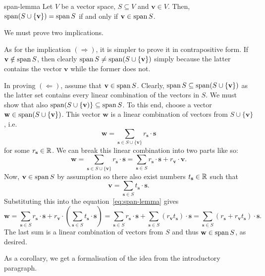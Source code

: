 \begin{lemma}{}{span-lemma}
 Let $V$ be a vector space, $S \subseteq V$ and $\mathbf{v} \in V$. Then, $\operatorname{span}
 (S \cup \{\mathbf{v}\}) = \operatorname{span} S$ if and only if $\mathbf{v} \in \operatorname{span} S$.
\end{lemma}
\begin{lemproof}
 We must prove two implications.

 As for the implication $( \Rightarrow )$, it is simpler to prove it in
 contrapositive form. If $\mathbf{v} \notin \operatorname{span} S$, then clearly $\operatorname{span} S \neq
 \operatorname{span} (S \cup \{\mathbf{v}\})$ simply because the latter contains the vector
 $\mathbf{v}$ while the former does not.

 In proving $( \Leftarrow )$, assume that $\mathbf{v} \in \operatorname{span} S$. Clearly,
 $\operatorname{span} S \subseteq \operatorname{span} (S \cup \{\mathbf{v}\})$ as the latter set contains
 every linear combination of the vectors in $S$. We must show that also $\operatorname{span}(S
 \cup \{\mathbf{v})\} \subseteq \operatorname{span} S$. To this end, choose a vector
 $\mathbf{w} \in \operatorname{span}(S \cup \{\mathbf{v}\})$. This vector $\mathbf{w}$ is a
 linear combination of vectors from $S \cup \{\mathbf{v}\}$, i.e.
 \[
  \mathbf{w} = \sum_{\mathbf{s} \in S \cup \{\mathbf{v}\}} r_{\mathbf{s}} \cdot
  \mathbf{s}
 \]
 for some $r_{\mathbf{s}} \in \mathbb{R}$. We can break this linear combination into two
 parts like so:
 \begin{equation}
  \label{eq:span-lemma}
  \mathbf{w} = \sum_{\mathbf{s} \in S \cup \{\mathbf{v}\}} r_{\mathbf{s}} \cdot
  \mathbf{s} = \sum_{\mathbf{s} \in S} r_{\mathbf{s}} \cdot \mathbf{s} +
  r_{\mathbf{v}} \cdot \mathbf{v}.
 \end{equation}
 Now, $\mathbf{v} \in \operatorname{span} S$ by assumption so there also exist numbers
 $t_{\mathbf{s}} \in \mathbb{R}$ such that
 \[
  \mathbf{v} = \sum_{\mathbf{s} \in S} t_{\mathbf{s}} \cdot \mathbf{s}.
 \]
 Substituting this into the equation~\eqref{eq:span-lemma} gives
 \[
  \mathbf{w} = \sum_{\mathbf{s} \in S} r_{\mathbf{s}} \cdot \mathbf{s} +
  r_{\mathbf{v}} \cdot \left( \sum_{\mathbf{s} \in S} t_{\mathbf{s}} \cdot
  \mathbf{s} \right) = \sum_{\mathbf{s} \in S} r_{\mathbf{s}} \cdot \mathbf{s} +
  \sum_{\mathbf{s} \in S} (r_{\mathbf{v}}t_{\mathbf{s}}) \cdot \mathbf{s} =
  \sum_{\mathbf{s} \in S} (r_{\mathbf{s}} + r_{\mathbf{v}}t_{\mathbf{s}}) \cdot
  \mathbf{s}.
 \]
 The last sum is a linear combination of vectors from $S$ and thus $\mathbf{w}
 \in \operatorname{span} S$, as desired.
\end{lemproof}

As a corollary, we get a formalisation of the idea from the introductory
paragraph.

